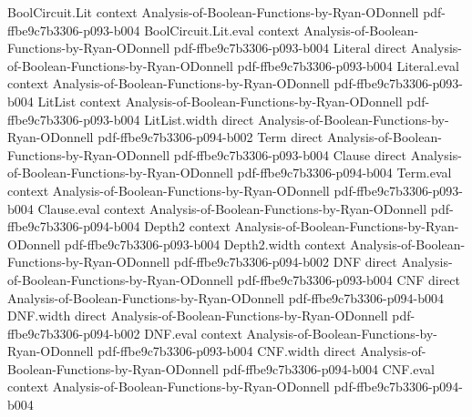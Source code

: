 \begin{lemma}
\label{DecisionTree.chiS_symmDiff_singleton}
\leanok
{}
\proofstep
  {BoolCircuit.Lit}
  {context}
  {Analysis-of-Boolean-Functions-by-Ryan-ODonnell}
  {pdf-ffbe9c7b3306-p093-b004}
\proofstep
  {BoolCircuit.Lit.eval}
  {context}
  {Analysis-of-Boolean-Functions-by-Ryan-ODonnell}
  {pdf-ffbe9c7b3306-p093-b004}
\proofstep
  {Literal}
  {direct}
  {Analysis-of-Boolean-Functions-by-Ryan-ODonnell}
  {pdf-ffbe9c7b3306-p093-b004}
\proofstep
  {Literal.eval}
  {context}
  {Analysis-of-Boolean-Functions-by-Ryan-ODonnell}
  {pdf-ffbe9c7b3306-p093-b004}
\proofstep
  {LitList}
  {context}
  {Analysis-of-Boolean-Functions-by-Ryan-ODonnell}
  {pdf-ffbe9c7b3306-p093-b004}
\proofstep
  {LitList.width}
  {direct}
  {Analysis-of-Boolean-Functions-by-Ryan-ODonnell}
  {pdf-ffbe9c7b3306-p094-b002}
\proofstep
  {Term}
  {direct}
  {Analysis-of-Boolean-Functions-by-Ryan-ODonnell}
  {pdf-ffbe9c7b3306-p093-b004}
\proofstep
  {Clause}
  {direct}
  {Analysis-of-Boolean-Functions-by-Ryan-ODonnell}
  {pdf-ffbe9c7b3306-p094-b004}
\proofstep
  {Term.eval}
  {context}
  {Analysis-of-Boolean-Functions-by-Ryan-ODonnell}
  {pdf-ffbe9c7b3306-p093-b004}
\proofstep
  {Clause.eval}
  {context}
  {Analysis-of-Boolean-Functions-by-Ryan-ODonnell}
  {pdf-ffbe9c7b3306-p094-b004}
\proofstep
  {Depth2}
  {context}
  {Analysis-of-Boolean-Functions-by-Ryan-ODonnell}
  {pdf-ffbe9c7b3306-p093-b004}
\proofstep
  {Depth2.width}
  {context}
  {Analysis-of-Boolean-Functions-by-Ryan-ODonnell}
  {pdf-ffbe9c7b3306-p094-b002}
\proofstep
  {DNF}
  {direct}
  {Analysis-of-Boolean-Functions-by-Ryan-ODonnell}
  {pdf-ffbe9c7b3306-p093-b004}
\proofstep
  {CNF}
  {direct}
  {Analysis-of-Boolean-Functions-by-Ryan-ODonnell}
  {pdf-ffbe9c7b3306-p094-b004}
\proofstep
  {DNF.width}
  {direct}
  {Analysis-of-Boolean-Functions-by-Ryan-ODonnell}
  {pdf-ffbe9c7b3306-p094-b002}
\proofstep
  {DNF.eval}
  {context}
  {Analysis-of-Boolean-Functions-by-Ryan-ODonnell}
  {pdf-ffbe9c7b3306-p093-b004}
\proofstep
  {CNF.width}
  {direct}
  {Analysis-of-Boolean-Functions-by-Ryan-ODonnell}
  {pdf-ffbe9c7b3306-p094-b004}
\proofstep
  {CNF.eval}
  {context}
  {Analysis-of-Boolean-Functions-by-Ryan-ODonnell}
  {pdf-ffbe9c7b3306-p094-b004}

\end{lemma}
